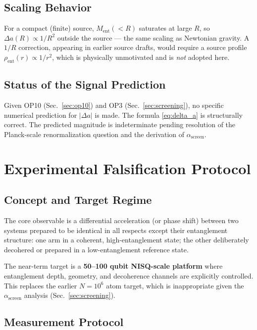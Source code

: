 \documentclass[12pt,letterpaper]{article}
\theoremstyle{plain}
\theoremstyle{definition}
\theoremstyle{remark}
\newcommand{\ascreen}{\alpha_{\mathrm{screen}}}
\begin{document}
\subsection{Scaling Behavior}

For a compact (finite) source, $M_{\mathrm{ent}}(<R)$ saturates at
large $R$, so $\Delta a(R) \propto 1/R^2$ outside the source --- the
same scaling as Newtonian gravity. A $1/R$ correction, appearing in
earlier source drafts, would require a source profile
$\rho_{\mathrm{ent}}(r) \propto 1/r^2$, which is physically unmotivated
and is \emph{not} adopted here.

\subsection{Status of the Signal Prediction}

Given OP10 (Sec.~\ref{sec:op10}) and OP3 (Sec.~\ref{sec:screening}),
no specific numerical prediction for $|\Delta a|$ is made. The formula
\eqref{eq:delta_a} is structurally correct. The predicted magnitude
is indeterminate pending resolution of the Planck-scale renormalization
question and the derivation of $\ascreen$.

\section{Experimental Falsification Protocol}
\label{sec:experiment_A}

\subsection{Concept and Target Regime}

The core observable is a differential acceleration (or phase shift)
between two systems prepared to be identical in all respects except
their entanglement structure: one arm in a coherent, high-entanglement
state; the other deliberately decohered or prepared in a
low-entanglement reference state.

The near-term target is a \textbf{50--100 qubit NISQ-scale platform}
where entanglement depth, geometry, and decoherence channels are
explicitly controlled. This replaces the earlier $N = 10^6$ atom target,
which is inappropriate given the $\ascreen$ analysis
(Sec.~\ref{sec:screening}).

\subsection{Measurement Protocol}
\end{document}
